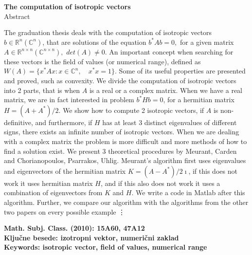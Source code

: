 \documentclass[12pt,a4paper]{amsart}
\theoremstyle{definition}
\theoremstyle{plain}
\newcommand{\R}{\mathbb R}
\newcommand{\C}{\mathbb C}
\begin{document}
\vfill
\begin{center}
{\bf The computation of isotropic vectors}\\[3mm]
{\sc Abstract}
\end{center}
The graduation thesis deals with the computation of isotropic vectors $b\in\R^{n} (\C^{n})$, that are solutions of the equation $b^\ast Ab=0,$ for a given matrix $A\in\R^{n\times n} (\C^{n\times n}),$ $det(A)\ne 0$.
An important concept when searching for these vectors is the field of values (or numerical range), defined as $W(A)=\{x^\ast Ax: x \in \C^n,\quad x^\ast x=1\}.$ Some of its useful properties are presented and proved, such as convexity.
We divide the computation of isotropic vectors into 2 parts, that is when $A$ is a real or a complex matrix.
When we have a real matrix, we are in fact interested in problem $b^\ast Hb=0$, for a hermitian matrix $H=(A+A^\ast)/2$. 
We show how to compute 2 isotropic vectors, if $A$ is non-definitive, and furthermore, if $H$ has at least 3 distinct eigenvalues of different signs, there exists an infinite number of isotropic vectors.
When we are dealing with a complex matrix the problem is more difficult and more methods of how to find a solution exist. We present 3 theoretical procedures by Meurant, Carden and Chorianopoulos, Psarrakos, Uhlig.
Meurant's algorithm first uses eigenvalues and eigenvectors of the hermitian matrix $K=(A-A^\ast)/2\imath$, if this does not work it uses hermitian matrix $H$, and if this also does not work it uses a combination of eigenvectors from $K$ and $H$.
We write a code in Matlab after this algorithm.
Further, we compare our algorithm with the algorithms from the other two papers on every possible example \vdots


\vfill\noindent
{\bf Math. Subj. Class. (2010): 15A60, 47A12}   \\[1mm]
{\bf Ključne besede: izotropni vektor, numerični zaklad}   \\[1mm]
{\bf Keywords: isotropic vector, field of values, numerical range}
\pagebreak
\end{document}
